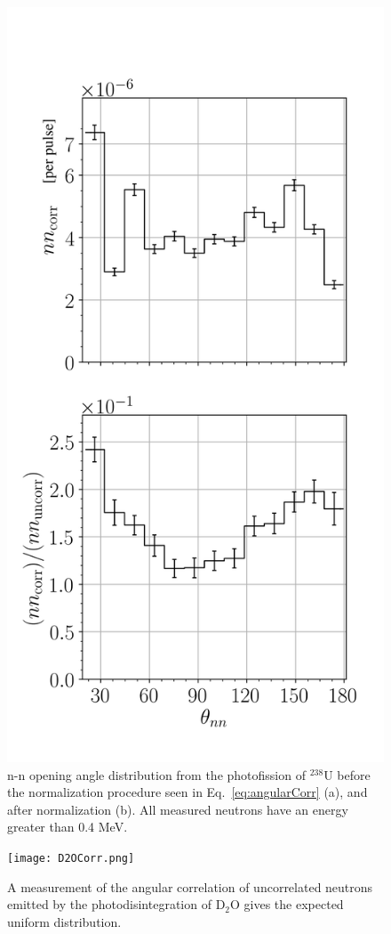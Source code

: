 \begin{figure}[]
\centering
    \includegraphics[width=\figsmall\textwidth]{SPDPNormalization.png}
    \caption{ n-n opening angle distribution from the photofission of $^{238}$U before the normalization procedure seen in Eq.~\ref{eq:angularCorr} (a), and after normalization (b).
    All measured neutrons have an energy greater than 0.4 MeV.}
    \label{fig:SPDPNormalization}
\end{figure}
\begin{figure}[]
\centering
    \texttt{[image: D2OCorr.png]}
    \caption{A measurement of the angular correlation of uncorrelated neutrons emitted by the photodisintegration of D$_{2}$O gives the expected uniform distribution.}
    \label{fig:D2OCorr}
\end{figure}

